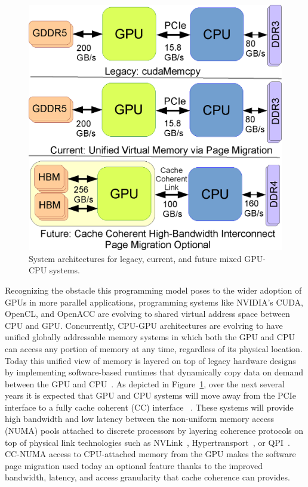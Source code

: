 \begin{figure}[t]
    \centering
    \includegraphics[width=0.7\columnwidth]{hpca2015/figures/architecture.eps}
    \caption{System architectures for legacy, current, and future mixed GPU-CPU systems.}
    \label{fig:arch-hpca2015}
\end{figure}

Recognizing the obstacle this programming model poses to the wider adoption of
GPUs in more parallel applications, programming systems like NVIDIA's CUDA,
OpenCL, and OpenACC are evolving to shared virtual address space between CPU and
GPU. Concurrently, CPU-GPU architectures are evolving to have unified globally
addressable memory systems in which both the GPU and CPU can access any portion
of memory at any time, regardless of its physical location.  Today this unified
view of memory is layered on top of legacy hardware designs by implementing
software-based runtimes that dynamically copy data on demand between the GPU and
CPU~\cite{cuda}. As depicted in Figure~\ref{fig:arch-hpca2015}, over the next
several years it is expected that GPU and CPU systems will move away from the
PCIe interface to a fully cache coherent (CC) interface ~\cite{AMDHSA}. These
systems will provide high bandwidth and low latency between the non-uniform
memory access (NUMA) pools attached to discrete processors by layering coherence
protocols on top of physical link technologies such as NVLink~\cite{NVLINK},
Hypertransport~\cite{AMDHT}, or QPI~\cite{INTELQPI}.   CC-NUMA access to
CPU-attached memory from the GPU makes the software page migration used today an
optional feature thanks to the improved bandwidth, latency, and access
granularity that cache coherence can provides.

